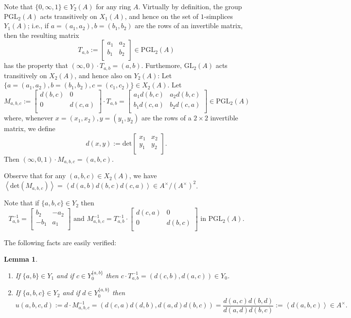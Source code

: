 \documentclass[12pt]{amsart}
\newtheorem{lem}{Lemma}[section]
\theoremstyle{definition}
\newcommand{\gl}[2]{\mathrm{GL}_{#1}(#2)}
\newcommand{\pgl}[2]{\mathrm{PGL}_{#1}(#2)}
\newcommand{\<}{\langle}
\renewcommand{\>}{\rangle}
\newcommand{\an}[1]{\left\langle{#1}\right\rangle}
\begin{document}
Note  that $\{ 0,\infty,1\}\in Y_2(A)$ for any ring $A$. Virtually by definition, the group $\pgl{2}{A}$ acts transitively on $X_1(A)$, and hence on the set of $1$-simplices $Y_1(A)$; i.e., if $a=(a_1,a_2), b=(b_1,b_2)$ are the rows of an invertible matrix, then the resulting matrix 
\[
T_{a,b}:=\left[
\begin{array}{cc}
a_1&a_2\\
b_1&b_2\\
\end{array}
\right]\in \pgl{2}{A}
\]
has the property that $(\infty,0)\cdot T_{a,b}=(a,b)$.
 Furthemore, $\gl{2}{A}$ acts transitively on $X_2(A)$, and hence also on $Y_2(A)$:
Let $\{  a=(a_1,a_2),b=(b_1,b_2),c=(c_1,c_2)\}\in X_2(A)$. Let
\[
M_{a,b,c}:= 
\left[
\begin{array}{cc}
d(b,c)&0\\
0&d(c,a)\\
\end{array}
\right]\cdot T_{a,b}=
\left[
\begin{array}{cc}
a_1d(b,c)&a_2d(b,c)\\
b_1d(c,a)&b_2d(c,a)\\
\end{array}
\right]
\in \pgl{2}{A}
\]
where, whenever $x=(x_1,x_2), y=(y_1,y_2)$ are the rows of a $2\times 2$ invertible matrix, we define
\[
d(x,y):= \mathrm{det}
\left[
\begin{array}{cc}
x_1&x_2\\
y_1&y_2\\
\end{array}
\right].
\]
Then $(\infty,0,1)\cdot M_{a,b,c}=(a,b,c)$. 

Observe that for any $(a,b,c)\in X_2(A)$, we have $\an{\mathrm{det}(M_{a,b,c})}=\an{d(a,b)d(b,c)d(c,a)}\in A^\times/(A^\times)^2$.

Note that if $\{ a,b,c\}\in Y_2$ then
\[
T_{a,b}^{-1}= \left[
\begin{array}{cc}
b_2&-a_2\\
-b_1&a_1\\
\end{array}
\right]
\mbox{ and }
M_{a,b,c}^{-1}=T_{a,b}^{-1}\cdot \left[
\begin{array}{cc}
d(c,a)&0\\
0&d(b,c)\\
\end{array}
\right]\mbox{ in } \pgl{2}{A}.
\]

The following facts are easily verified:
\begin{lem}  \label{lem:cr}
\begin{enumerate}
\item If $\{ a,b\}\in Y_1$ and if $c\in Y^{\{ a,b\}}_0$ then $c\cdot T_{a,b}^{-1}=(d(c,b),d(a,c))\in Y_0$.
\item If $\{a,b,c\}\in Y_2$ and if $d\in Y^{\{ a,b\}}_0$ then 
\[
u(a,b,c,d):=d\cdot M_{a,b,c}^{-1}=\left( d(c,a)d(d,b),d(a,d)d(b,c)\right)=\frac{ d(a,c)d(b,d)}{d(a,d)d(b,c)}:=\an{d(a,b,c)}\in A^\times.
\]
\end{enumerate}
\end{lem}
\end{document}
